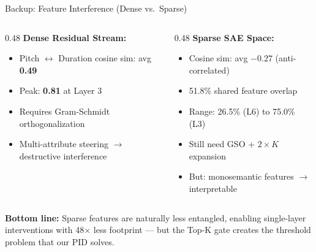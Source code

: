 \documentclass[aspectratio=169, 11pt]{beamer}
\begin{document}
\begin{frame}[noframenumbering]{Backup: Feature Interference (Dense vs.\ Sparse)}

\begin{columns}[T]
\begin{column}{0.48\textwidth}
\textbf{Dense Residual Stream:}
\begin{itemize}
  \item Pitch $\leftrightarrow$ Duration cosine sim: avg \textbf{0.49}
  \item Peak: \textbf{0.81} at Layer 3
  \item Requires Gram-Schmidt orthogonalization
  \item Multi-attribute steering $\to$ destructive interference
\end{itemize}
\end{column}

\begin{column}{0.48\textwidth}
\textbf{Sparse SAE Space:}
\begin{itemize}
  \item Cosine sim: avg $-0.27$ (anti-correlated)
  \item 51.8\% shared feature overlap
  \item Range: 26.5\% (L6) to 75.0\% (L3)
  \item Still need GSO + $2\times K$ expansion
  \item But: monosemantic features $\to$ interpretable
\end{itemize}
\end{column}
\end{columns}

\vspace{1em}
\begin{center}
\textbf{Bottom line:} Sparse features are naturally less entangled, enabling single-layer interventions with 48$\times$ less footprint --- but the Top-K gate creates the threshold problem that our PID solves.
\end{center}
\end{frame}
\end{document}

